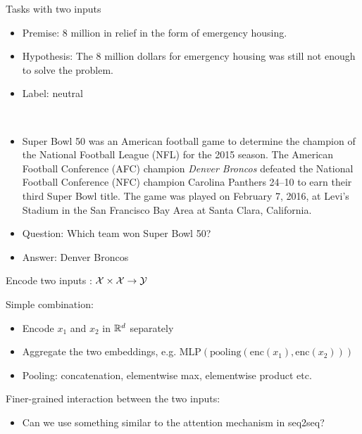 \documentclass[usenames,dvipsnames,notes]{beamer}
\begin{document}
\begin{frame}
    {Tasks with two inputs}
    \\
    \begin{itemize}
        \item[] Premise: 8 million in relief in the form of emergency housing.
        \item[] Hypothesis: The 8 million dollars for emergency housing was still not enough to solve the problem. 
        \item[] Label: neutral
    \end{itemize}

    \\
    \begin{itemize}
        \item[] 
    \begin{tcolorbox}
        {\small
        Super Bowl 50 was an American football game to determine the champion of the National Football League (NFL) for the 2015 season. The American Football Conference (AFC) champion \emph{Denver Broncos} defeated the National Football Conference (NFC) champion Carolina Panthers 24--10 to earn their third Super Bowl title. The game was played on February 7, 2016, at Levi's Stadium in the San Francisco Bay Area at Santa Clara, California.}
    \end{tcolorbox}
\item[] Question: Which team won Super Bowl 50?
\item[] Answer: Denver Broncos 
    \end{itemize}
\end{frame}

\begin{frame}
    {Encode two inputs}
    : $\mathcal{X} \times \mathcal{X} \rightarrow \mathcal{Y}$

    Simple combination:\\
    \begin{itemize}
        \item Encode $x_1$ and $x_2$ in $\mathbb{R}^d$ separately
        \item Aggregate the two embeddings, e.g. $\text{MLP}(\text{pooling}(\text{enc}(x_1), \text{enc}(x_2)))$
        \item Pooling: concatenation, elementwise max, elementwise product etc.
    \end{itemize}

    Finer-grained interaction between the two inputs:\\
    \begin{itemize}
        \item Can we use something similar to the attention mechanism in seq2seq?
    \end{itemize}
            \vspace{6em}
\end{frame}
\end{document}
